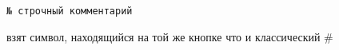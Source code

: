 \clearpage{}\label{core}\secdown


\begin{verbatim}
№ строчный комментарий
\end{verbatim}

взят символ, находящийся на той же кнопке что и классический \#

\secup
